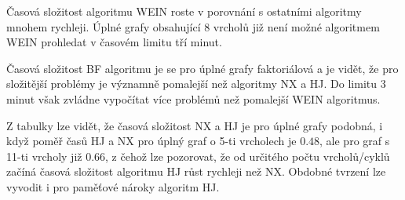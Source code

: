         Časová složitost algoritmu WEIN roste v porovnání s ostatními algoritmy mnohem rychleji. Úplné grafy obsahující 8 vrcholů již není možné algoritmem WEIN prohledat v časovém limitu tří minut.

        Časová složitost BF algoritmu je se pro úplné grafy faktoriálová a je vidět, že pro složitější problémy je významně pomalejší než algoritmy NX a HJ. Do limitu 3 minut však zvládne vypočítat více problémů než pomalejší WEIN algoritmus.

        Z tabulky lze vidět, že časová složitost NX a HJ je pro úplné grafy podobná, i když poměř časů HJ a NX pro úplný graf o 5-ti vrcholech je $0.48$, ale pro graf s 11-ti vrcholy již $0.66$, z čehož lze pozorovat, že od určitého počtu vrcholů/cyklů začíná časová složitost algoritmu HJ růst rychleji než NX. Obdobné tvrzení lze vyvodit i pro paměťové nároky algoritm HJ.

